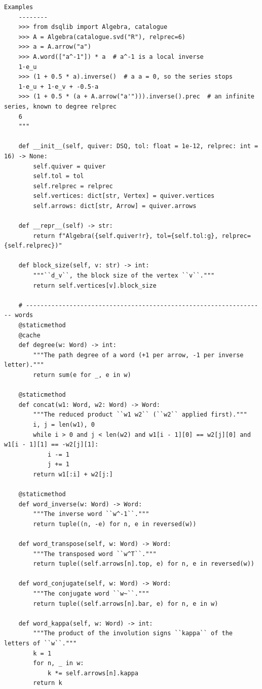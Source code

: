 \documentclass[12pt, a4paper]{report}
\theoremstyle{plain}
\theoremstyle{definition}
\theoremstyle{remark}
\theoremstyle{plain}
\begin{document}
\begin{lstlisting}[style=dsqcode]
    Examples
    --------
    >>> from dsqlib import Algebra, catalogue
    >>> A = Algebra(catalogue.svd("R"), relprec=6)
    >>> a = A.arrow("a")
    >>> A.word(["a^-1"]) * a  # a^-1 is a local inverse
    1·e_u
    >>> (1 + 0.5 * a).inverse()  # a a = 0, so the series stops
    1·e_u + 1·e_v + -0.5·a
    >>> (1 + 0.5 * (a + A.arrow("a'"))).inverse().prec  # an infinite series, known to degree relprec
    6
    """

    def __init__(self, quiver: DSQ, tol: float = 1e-12, relprec: int = 16) -> None:
        self.quiver = quiver
        self.tol = tol
        self.relprec = relprec
        self.vertices: dict[str, Vertex] = quiver.vertices
        self.arrows: dict[str, Arrow] = quiver.arrows

    def __repr__(self) -> str:
        return f"Algebra({self.quiver!r}, tol={self.tol:g}, relprec={self.relprec})"

    def block_size(self, v: str) -> int:
        """``d_v``, the block size of the vertex ``v``."""
        return self.vertices[v].block_size

    # ------------------------------------------------------------------ words
    @staticmethod
    @cache
    def degree(w: Word) -> int:
        """The path degree of a word (+1 per arrow, -1 per inverse letter)."""
        return sum(e for _, e in w)

    @staticmethod
    def concat(w1: Word, w2: Word) -> Word:
        """The reduced product ``w1 w2`` (``w2`` applied first)."""
        i, j = len(w1), 0
        while i > 0 and j < len(w2) and w1[i - 1][0] == w2[j][0] and w1[i - 1][1] == -w2[j][1]:
            i -= 1
            j += 1
        return w1[:i] + w2[j:]

    @staticmethod
    def word_inverse(w: Word) -> Word:
        """The inverse word ``w^-1``."""
        return tuple((n, -e) for n, e in reversed(w))

    def word_transpose(self, w: Word) -> Word:
        """The transposed word ``w^T``."""
        return tuple((self.arrows[n].top, e) for n, e in reversed(w))

    def word_conjugate(self, w: Word) -> Word:
        """The conjugate word ``w~``."""
        return tuple((self.arrows[n].bar, e) for n, e in w)

    def word_kappa(self, w: Word) -> int:
        """The product of the involution signs ``kappa`` of the letters of ``w``."""
        k = 1
        for n, _ in w:
            k *= self.arrows[n].kappa
        return k


\end{lstlisting}
\end{document}
